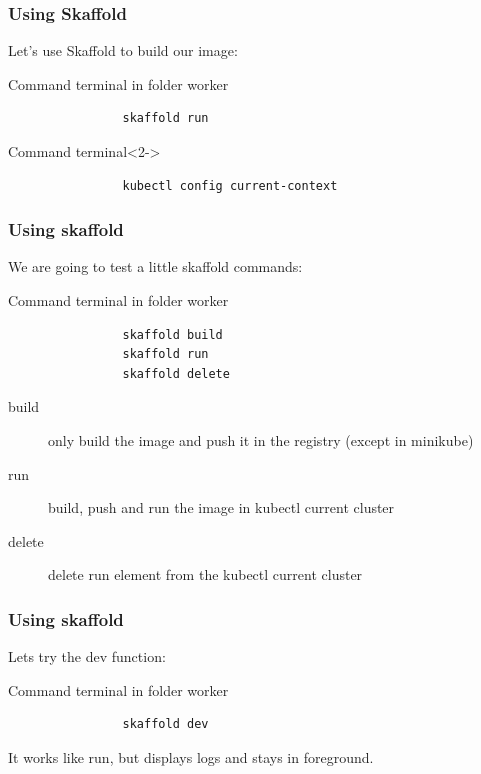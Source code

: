 	\begin{frame}[fragile]
		\frametitle{Using Skaffold}
		
		Let's use Skaffold to build our image:
		\begin{block}{Command terminal in folder worker}
			\begin{verbatim}
				skaffold run
			\end{verbatim}
		\end{block}
		
		\bigskip
		

		\begin{block}{Command terminal}<2->
			\begin{verbatim}
				kubectl config current-context
			\end{verbatim}
		\end{block}				
	\end{frame}
	
	\begin{frame}[fragile]
		\frametitle{Using skaffold}
		
		We are going to test a little skaffold commands:
		\begin{block}{Command terminal in folder worker}
			\begin{verbatim}
				skaffold build
				skaffold run
				skaffold delete
			\end{verbatim}					
		\end{block}
		
		\begin{description}
			\item[build] only build the image and push it in the registry (except in minikube)
			\item[run] build, push and run the image in kubectl current cluster
			\item[delete] delete run element from the kubectl current cluster
		\end{description}
	
	\end{frame}
	
	\begin{frame}[fragile]
		\frametitle{Using skaffold}
		
		Lets try the dev function:
		\begin{block}{Command terminal in folder worker}
			\begin{verbatim}
				skaffold dev
			\end{verbatim}					
		\end{block}

		It works like run, but displays logs and stays in foreground.
	\end{frame}
	
